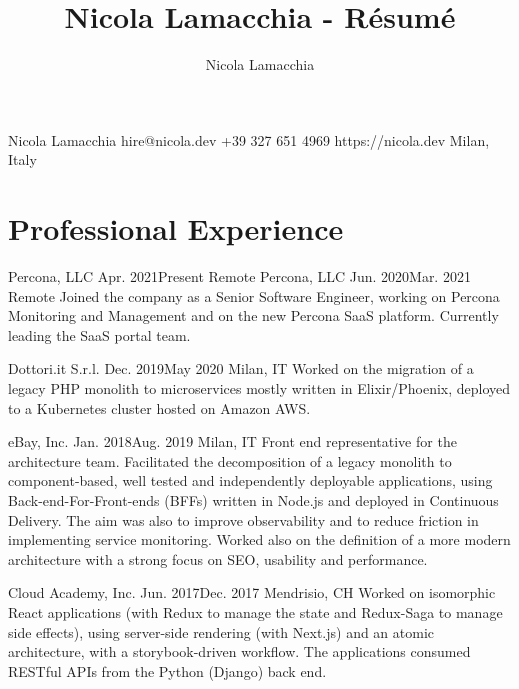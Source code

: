 \documentclass{resume}
\title{Nicola Lamacchia - Résumé}
\author{Nicola Lamacchia}
\begin{document}
\heading%
    {Nicola}
    {Lamacchia}
    {}
    {hire@nicola.dev}%
    {+39 327 651 4969}%
    {https://nicola.dev}
    {Milan, Italy}

\separator[cvlightgray]


\section{Professional Experience}

\begin{cvsection}
        {Percona, LLC}%
        {Apr. 2021}{Present}%
        {Remote}{}%
        {Percona, LLC}%
        {Jun. 2020}{Mar. 2021}%
        {Remote}%
        {%
            Joined the company as a Senior Software Engineer, working on Percona
            Monitoring and Management and on the new Percona SaaS platform.
            Currently leading the SaaS portal team.
        }

        {Dottori.it S.r.l.}%
        {Dec. 2019}{May 2020}%
        {Milan, IT}%
        {Worked on the migration of a legacy PHP monolith to microservices mostly
            written in Elixir/Phoenix, deployed to a Kubernetes cluster hosted on
            Amazon AWS.}

        {eBay, Inc.}%
        {Jan. 2018}{Aug. 2019}%
        {Milan, IT}%
        {Front end representative for the architecture team. Facilitated the
            decomposition of a legacy monolith to component-based, well tested and
            independently deployable applications, using Back-end-For-Front-ends
            (BFFs) written in Node.js and deployed in Continuous Delivery. The aim
            was also to improve observability and to reduce friction in
            implementing service monitoring. Worked also on the definition of a
            more modern architecture with a strong focus on SEO, usability and
            performance.}

        {Cloud Academy, Inc.}%
        {Jun. 2017}{Dec. 2017}%
        {Mendrisio, CH}%
        {Worked on isomorphic React applications (with Redux to manage the state and
            Redux-Saga to manage side effects), using server-side rendering (with
            Next.js) and an atomic architecture, with a storybook-driven workflow.
            The applications consumed RESTful APIs from the Python (Django) back
            end.}


\end{cvsection}
\end{document}
